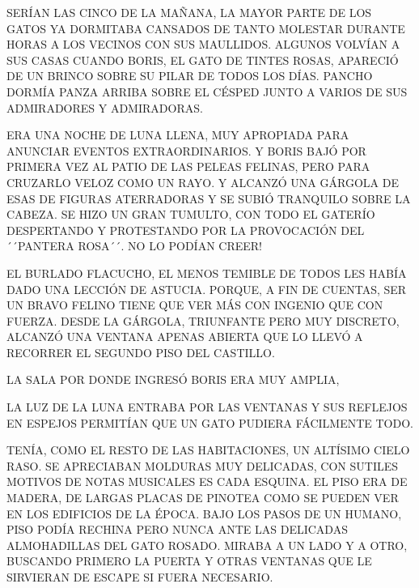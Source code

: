 SERÍAN LAS CINCO DE LA MAÑANA, LA MAYOR PARTE DE LOS GATOS YA DORMITABA CANSADOS DE TANTO MOLESTAR DURANTE HORAS A LOS VECINOS CON SUS MAULLIDOS. ALGUNOS VOLVÍAN A SUS CASAS CUANDO BORIS, EL GATO DE TINTES ROSAS, APARECIÓ DE UN BRINCO SOBRE SU PILAR DE TODOS LOS DÍAS. PANCHO DORMÍA PANZA ARRIBA SOBRE EL CÉSPED JUNTO A VARIOS DE SUS ADMIRADORES Y ADMIRADORAS. 
\newpage
{}
ERA UNA NOCHE DE LUNA LLENA, MUY APROPIADA PARA ANUNCIAR EVENTOS EXTRAORDINARIOS.
Y BORIS BAJÓ POR PRIMERA VEZ AL PATIO DE LAS PELEAS FELINAS, PERO PARA CRUZARLO VELOZ COMO UN RAYO. Y ALCANZÓ UNA GÁRGOLA DE ESAS DE FIGURAS ATERRADORAS Y SE SUBIÓ TRANQUILO SOBRE LA CABEZA. SE HIZO UN GRAN TUMULTO, CON TODO EL GATERÍO DESPERTANDO Y PROTESTANDO POR LA PROVOCACIÓN DEL ´´PANTERA ROSA´´. NO LO PODÍAN CREER!

EL BURLADO FLACUCHO, EL MENOS TEMIBLE DE TODOS LES HABÍA DADO UNA LECCIÓN DE ASTUCIA. PORQUE, A FIN DE CUENTAS, SER UN BRAVO FELINO TIENE QUE VER MÁS CON INGENIO QUE CON FUERZA. DESDE LA GÁRGOLA, TRIUNFANTE PERO MUY DISCRETO, ALCANZÓ UNA VENTANA APENAS ABIERTA QUE LO LLEVÓ A RECORRER EL SEGUNDO PISO DEL CASTILLO. 

\newpage
{}
LA SALA POR DONDE INGRESÓ BORIS ERA MUY AMPLIA, 

LA LUZ DE LA LUNA ENTRABA POR LAS VENTANAS Y SUS REFLEJOS EN ESPEJOS PERMITÍAN QUE UN GATO PUDIERA FÁCILMENTE TODO.

TENÍA, COMO EL RESTO DE LAS HABITACIONES, UN ALTÍSIMO CIELO RASO. SE APRECIABAN MOLDURAS MUY DELICADAS, CON SUTILES MOTIVOS DE NOTAS MUSICALES ES CADA ESQUINA. EL PISO ERA DE MADERA, DE LARGAS PLACAS DE PINOTEA COMO SE PUEDEN VER EN LOS EDIFICIOS DE LA ÉPOCA. 
BAJO LOS PASOS DE UN HUMANO, PISO PODÍA RECHINA PERO NUNCA ANTE LAS DELICADAS ALMOHADILLAS DEL GATO ROSADO. MIRABA A UN LADO Y A OTRO, BUSCANDO PRIMERO LA PUERTA Y OTRAS VENTANAS QUE LE SIRVIERAN DE ESCAPE SI FUERA NECESARIO. 


